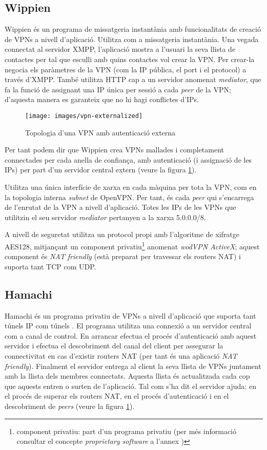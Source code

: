 \subsection{Wippien}
Wippien és un programa de missatgeria instantània amb funcionalitats de creació de VPNs a nivell d'aplicació. Utilitza  com a missatgeria instantània. Una vegada connectat al servidor XMPP, l'aplicació mostra a l'usuari la seva llista de contactes per tal que esculli amb quins contactes vol crear la VPN. Per crear-la negocia els paràmetres de la VPN (com la IP pública, el port i el protocol) a través d'XMPP. També utilitza HTTP cap a un servidor anomenat \emph{mediator}, que fa la funció de  assignant una IP única per sessió a cada \emph{peer} de la VPN; d'aquesta manera es garanteix que no hi hagi conflictes d'IPs.
\begin{figure}[htb]
\centering
\texttt{[image: images/vpn-externalized]}
\caption{Topologia d'una VPN amb autenticació externa}
\label{F:vpn-externalized}
\end{figure}
Per tant podem dir que Wippien crea VPNs mallades i completament connectades per cada anella de confiança, amb autenticació (i assignació de les IPs) per part d'un servidor central extern (veure la figura \ref{F:vpn-externalized}).

Utilitza una única interfície de xarxa en cada màquina per tota la VPN, com en la topologia interna \emph{subnet} de OpenVPN. Per tant, és cada \emph{peer} qui s'encarrega de l'enrutat de la VPN a nivell d'aplicació. Totes les IPs de les VPNs que utilitzin el seu servidor \emph{mediator} pertanyen a la xarxa 5.0.0.0/8.

A nivell de seguretat utilitza un protocol propi amb l'algoritme de xifratge AES128, mitjançant un component privatiu\footnote{component privatiu: part d'un programa privatiu (per més informació consultar el concepte \emph{proprietary software} a l'annex )} anomenat \emph{wodVPN ActiveX}; aquest component és \emph{NAT friendly} (està preparat per travessar els routers NAT) i suporta tant TCP com UDP.

\subsection{Hamachi}
Hamachi és un programa privatiu de VPNs a nivell d'aplicació que suporta tant túnels IP com túnels .
El programa utilitza una connexió a un servidor central com a canal de control. En arrancar efectua el procés d'autenticació amb aquest servidor i efectua el descobriment del canal del client per assegurar la connectivitat en cas d'existir routers NAT (per tant és una aplicació \emph{NAT friendly}). Finalment el servidor entrega al client la seva llista de VPNs juntament amb la llista dels membres connectats. Aquesta llista és actualitzada cada cop que aquests entren o surten de l'aplicació. Tal com s'ha dit el servidor ajuda: en el procés de superar els routers NAT, en el procés d'autenticació i en el descobriment de \emph{peers} (veure la figura \ref{F:vpn-externalized}).

